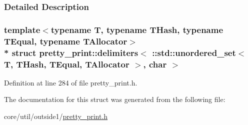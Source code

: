 \subsubsection{Detailed Description}
\subsubsection*{template$<$typename T, typename T\+Hash, typename T\+Equal, typename T\+Allocator$>$\\*
struct pretty\+\_\+print\+::delimiters$<$ \+::std\+::unordered\+\_\+set$<$ T, T\+Hash, T\+Equal, T\+Allocator $>$, char $>$}



Definition at line 284 of file pretty\+\_\+print.\+h.



The documentation for this struct was generated from the following file\+:\begin{DoxyCompactItemize}
\item 
core/util/outside1/\hyperlink{pretty__print_8h}{pretty\+\_\+print.\+h}\end{DoxyCompactItemize}
